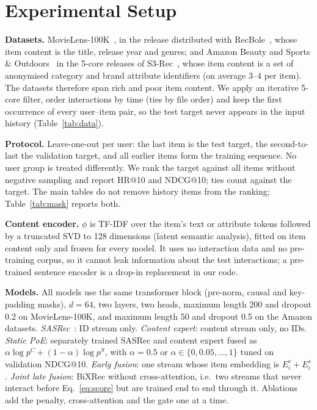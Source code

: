 \documentclass[conference]{IEEEtran}
\begin{document}
\section{Experimental Setup}\label{sec:setup}

\textbf{Datasets.} MovieLens-100K~\cite{harper2015movielens}, in the release distributed with
RecBole~\cite{zhao2021recbole}, whose item content is the title, release year and genres; and Amazon
Beauty and Sports \& Outdoors~\cite{mcauley2015image} in the 5-core releases of S3-Rec~\cite{zhou2020s3rec}, whose
item content is a set of anonymised category and brand attribute identifiers (on average 3--4 per item). The
datasets therefore span rich and poor item content. We apply an iterative 5-core filter, order interactions by time (ties by file order) and
keep the first occurrence of every user--item pair, so the test target never appears in the input history
(Table~\ref{tab:data}).

\tabData

\textbf{Protocol.} Leave-one-out per user: the last item is the test target, the second-to-last the validation
target, and all earlier items form the training sequence. No user group is treated differently. We rank the target
against all items without negative sampling and report HR@10 and NDCG@10; ties count against the target. The main
tables do not remove history items from the ranking; Table~\ref{tab:mask} reports both.

\textbf{Content encoder.} $\phi$ is TF-IDF over the item's text or attribute tokens followed by a truncated SVD to
128 dimensions (latent semantic analysis), fitted on item content only and frozen for every model. It uses no
interaction data and no pre-training corpus, so it cannot leak information about the test interactions; a
pre-trained sentence encoder is a drop-in replacement in our code.

\textbf{Models.} All models use the same transformer block (pre-norm, causal and key-padding masks), $d=64$, two
layers, two heads, maximum length 200 and dropout 0.2 on MovieLens-100K, and maximum length 50 and dropout 0.5 on
the Amazon datasets. \emph{SASRec}~\cite{kang2018sasrec}: ID stream only. \emph{Content expert}: content stream only, no IDs.
\emph{Static PoE}: separately trained SASRec and content expert fused as $\alpha\log p^C+(1-\alpha)\log p^S$, with
$\alpha=0.5$ or $\alpha\in\{0,0.05,\dots,1\}$ tuned on validation NDCG@10. \emph{Early fusion}: one stream whose item
embedding is $E^c_i+E^s_i$. \emph{Joint late fusion}: BiXRec without cross-attention, i.e.\ two streams that never
interact before Eq.~\eqref{eq:score} but are trained end to end through it. Ablations add the penalty,
cross-attention and the gate one at a time.
\end{document}
